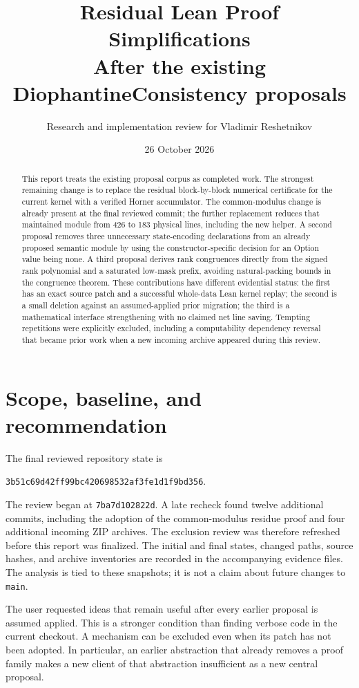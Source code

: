 \documentclass[11pt,a4paper]{article}
\title{\color{navy}\sffamily Residual Lean Proof Simplifications\\[5pt]\large After the existing DiophantineConsistency proposals}
\author{Research and implementation review for Vladimir Reshetnikov}
\date{26 October 2026}
\newcommand{\code}[1]{\texttt{#1}}
\newcommand{\ReviewSHA}{3b51c69d42ff99bc420698532af3fe1d1f9bd356}
\begin{document}
\maketitle
\thispagestyle{fancy}
\begin{abstract}
This report treats the existing proposal corpus as completed work. The strongest remaining change is to replace the residual block-by-block numerical certificate for the current kernel with a verified Horner accumulator. The common-modulus change is already present at the final reviewed commit; the further replacement reduces that maintained module from 426 to 183 physical lines, including the new helper. A second proposal removes three unnecessary state-encoding declarations from an already proposed semantic module by using the constructor-specific decision for an Option value being none. A third proposal derives rank congruences directly from the signed rank polynomial and a saturated low-mask prefix, avoiding natural-packing bounds in the congruence theorem. These contributions have different evidential status: the first has an exact source patch and a successful whole-data Lean kernel replay; the second is a small deletion against an assumed-applied prior migration; the third is a mathematical interface strengthening with no claimed net line saving. Tempting repetitions were explicitly excluded, including a computability dependency reversal that became prior work when a new incoming archive appeared during this review.
\end{abstract}

\section{Scope, baseline, and recommendation}

The final reviewed repository state is
\begin{center}
\small\texttt{\ReviewSHA}.
\end{center}
The review began at \texttt{7ba7d102822d}. A late recheck found twelve additional commits, including the adoption of the common-modulus residue proof and four additional incoming ZIP archives. The exclusion review was therefore refreshed before this report was finalized. The initial and final states, changed paths, source hashes, and archive inventories are recorded in the accompanying evidence files. The analysis is tied to these snapshots; it is not a claim about future changes to \code{main}.

The user requested ideas that remain useful after every earlier proposal is assumed applied. This is a stronger condition than finding verbose code in the current checkout. A mechanism can be excluded even when its patch has not been adopted. In particular, an earlier abstraction that already removes a proof family makes a new client of that abstraction insufficient as a new central proposal.
\end{document}
